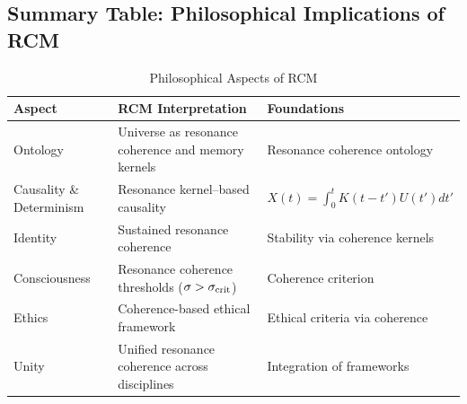 \subsection{Summary Table: Philosophical Implications of RCM}
\begin{table}[ht]
  \centering
  \caption{Philosophical Aspects of RCM}
  \label{tab:philosophy_summary}
  \begin{tabular}{@{}lll@{}}
    \toprule
    Aspect                   & RCM Interpretation                                    & Foundations \\
    \midrule
    Ontology                 & Universe as resonance coherence and memory kernels     & Resonance coherence ontology \\
    Causality \& Determinism & Resonance kernel–based causality                      & $X(t)=\int_{0}^{t}K(t-t')U(t')dt'$ \\
    Identity                 & Sustained resonance coherence                          & Stability via coherence kernels \\
    Consciousness            & Resonance coherence thresholds ($\sigma>\sigma_{\rm crit}$) & Coherence criterion \\
    Ethics                   & Coherence-based ethical framework                      & Ethical criteria via coherence \\
    Unity                    & Unified resonance coherence across disciplines         & Integration of frameworks \\
    \bottomrule
  \end{tabular}
\end{table}




